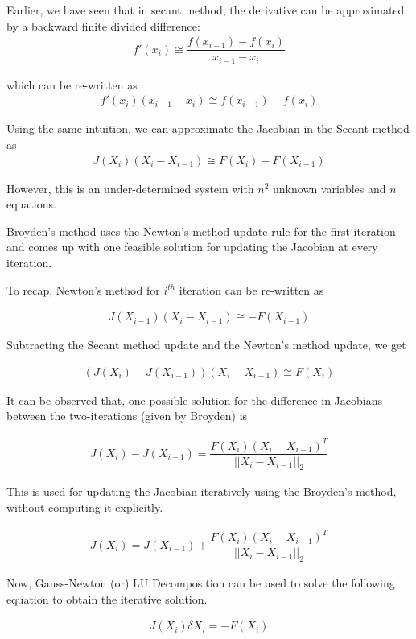 \documentclass[book.tex]{subfiles}
\begin{document}
Earlier, we have seen that in secant method, the derivative can be approximated by a backward finite divided difference:
\begin{align}
f'(x_i) \cong \dfrac{f(x_{i-1}) - f(x_{i})}{x_{i-1} - x_{i}}
\end{align}
	
which can be re-written as 
\begin{align}
f'(x_i) (x_{i-1} - x_{i}) \cong f(x_{i-1}) - f(x_{i})
\end{align}
	
Using the same intuition, we can approximate the Jacobian in the Secant method as
\begin{align}
J(X_{i})(X_{i} - X_{i-1}) \cong F(X_{i}) - F(X_{i-1})
\end{align}
	
However, this is an under-determined system with $n^2$ unknown variables and $n$ equations. 
	
Broyden's method uses the Newton's method update rule for the first iteration and comes up with one feasible solution for updating the Jacobian at every iteration.
	
To recap, Newton's method for $i^{th}$ iteration can be re-written as
	
\begin{align}
J(X_{i-1})(X_{i} - X_{i-1}) \cong - F(X_{i-1})
\end{align}
		
Subtracting the Secant method update and the Newton's method update, we get
	
\begin{align}
(J(X_{i}) - 	J(X_{i-1}))(X_{i} - X_{i-1}) \cong F(X_{i})
\end{align}

It can be observed that, one possible solution for the difference in Jacobians between the two-iterations (given by Broyden) is 
	
\begin{align}
J(X_{i}) - J(X_{i-1}) = \dfrac{F(X_i)(X_{i} - X_{i-1})^T}{||X_{i} - X_{i-1}||_2}
\end{align}
	
This is used for updating the Jacobian iteratively using the Broyden's method, without computing it explicitly.
	
\begin{align}
J(X_{i})  = J(X_{i-1}) + 	\dfrac{F(X_{i})(X_{i} - X_{i-1})^T}{||X_{i} - X_{i-1}||_2}
\end{align}
	
Now, Gauss-Newton (or) LU Decomposition can be used to solve the following equation to obtain the iterative solution. 

\begin{align}
J(X_{i})\delta X_i =  - F(X_{i})
\end{align}
	 
\end{document}
